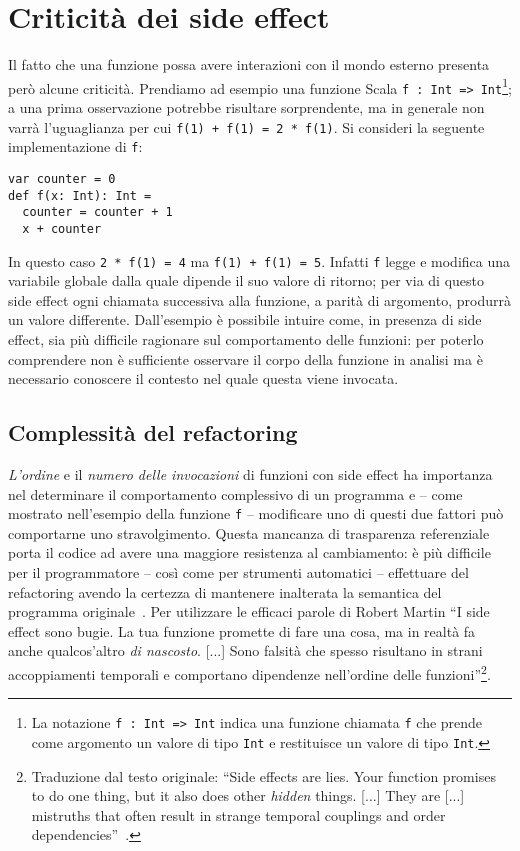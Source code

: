 \section{Criticità dei side effect}
\label{section:criticita-dei-side-effect}

Il fatto che una funzione possa avere interazioni con il mondo esterno presenta però alcune criticità.
Prendiamo ad esempio una funzione Scala \lstinline{f : Int => Int}\footnote{La notazione \lstinline{f : Int => Int} indica una funzione chiamata \lstinline{f} che prende come argomento un valore di tipo \lstinline{Int} e restituisce un valore di tipo \lstinline{Int}.}; a una prima osservazione potrebbe risultare sorprendente, ma in generale non varrà l'uguaglianza per cui \lstinline{f(1) + f(1) = 2 * f(1)}.
Si consideri la seguente implementazione di \lstinline{f}:
\begin{lstlisting}[language=scala3]
var counter = 0
def f(x: Int): Int =
  counter = counter + 1
  x + counter
\end{lstlisting}
In questo caso \lstinline{2 * f(1) = 4} ma \lstinline{f(1) + f(1) = 5}.
Infatti \lstinline{f} legge e modifica una variabile globale dalla quale dipende il suo valore di ritorno; per via di questo side effect ogni chiamata successiva alla funzione, a parità di argomento, produrrà un valore differente.
Dall'esempio è possibile intuire come, in presenza di side effect, sia più difficile ragionare sul comportamento delle funzioni: per poterlo comprendere non è sufficiente osservare il corpo della funzione in analisi ma è necessario conoscere il contesto nel quale questa viene invocata.

\subsection{Complessità del refactoring}
\label{subsection:complessita-del-refactoring}
\emph{L'ordine} e il \emph{numero delle invocazioni} di funzioni con side effect ha importanza nel determinare il comportamento complessivo di un programma e -- come mostrato nell'esempio della funzione \lstinline{f} -- modificare uno di questi due fattori può comportarne uno stravolgimento.
Questa mancanza di trasparenza referenziale porta il codice ad avere una maggiore resistenza al cambiamento: è più difficile per il programmatore -- così come per strumenti automatici -- effettuare del refactoring avendo la certezza di mantenere inalterata la semantica del programma originale~\cite{cit:towards-purity-guided-refactoring-in-java}.
Per utilizzare le efficaci parole di Robert Martin ``I side effect sono bugie. La tua funzione promette di fare una cosa, ma in realtà fa anche qualcos'altro \emph{di nascosto}. [...] Sono falsità che spesso risultano in strani accoppiamenti temporali e comportano dipendenze nell'ordine delle funzioni''\footnote{Traduzione dal testo originale: ``Side effects are lies. Your function promises to do one thing, but it also does other \emph{hidden} things. [...] They are [...] mistruths that often result in strange temporal couplings and order dependencies''~\cite[p.~44]{cit:clean-code-a-handbook-of-agile-software-craftsmanship}.}.

